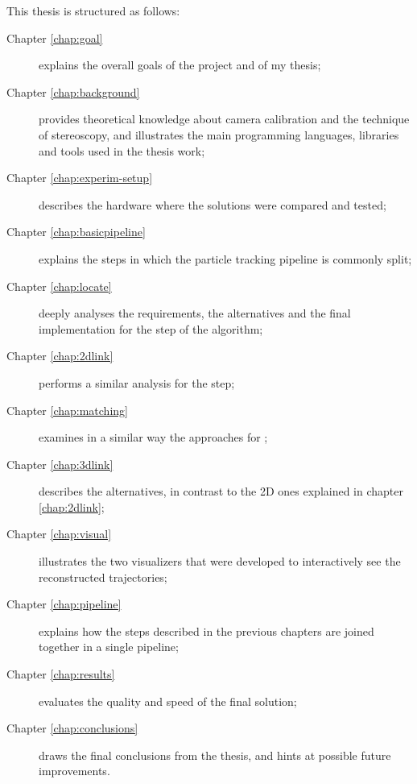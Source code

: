 

\newcommand{\structuretype}{description}
\newcommand{\structureitem}[2]{\item[Chapter #1] #2}

This thesis is structured as follows:

\begin{\structuretype}
	\structureitem{\ref{chap:goal}}{explains the overall goals of the project and of my thesis;}
	\structureitem{\ref{chap:background}}{provides theoretical knowledge about camera calibration and the technique of stereoscopy, and illustrates the main programming languages, libraries and tools used in the thesis work;}
	\structureitem{\ref{chap:experim-setup}}{describes the hardware where the solutions were compared and tested;}
	\structureitem{\ref{chap:basicpipeline}}{explains the steps in which the particle tracking pipeline is commonly split;}
	\structureitem{\ref{chap:locate}}{deeply analyses the requirements, the alternatives and the final implementation for the \locate* step of the algorithm;}
	\structureitem{\ref{chap:2dlink}}{performs a similar analysis for the \linkDD* step;}
	\structureitem{\ref{chap:matching}}{examines in a similar way the approaches for \match*;}
	\structureitem{\ref{chap:3dlink}}{describes the \linkDDD* alternatives, in contrast to the 2D ones explained in chapter \ref{chap:2dlink};}
	\structureitem{\ref{chap:visual}}{illustrates the two visualizers that were developed to interactively see the reconstructed trajectories;}
	\structureitem{\ref{chap:pipeline}}{explains how the steps described in the previous chapters are joined together in a single pipeline;}
	\structureitem{\ref{chap:results}}{evaluates the quality and speed of the final solution;}
	\structureitem{\ref{chap:conclusions}}{draws the final conclusions from the thesis, and hints at possible future improvements.}
\end{\structuretype}
